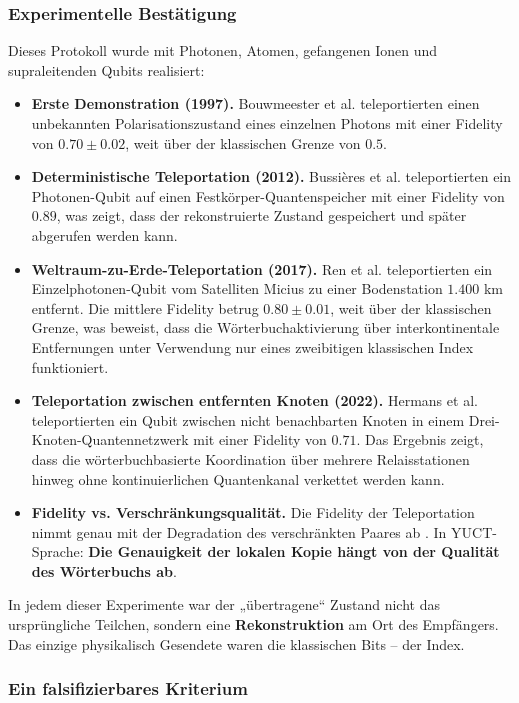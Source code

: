 \documentclass[12pt,a4paper]{article}
\theoremstyle{remark}
\begin{document}
	\subsubsection{Experimentelle Bestätigung}
	
	Dieses Protokoll wurde mit Photonen, Atomen, gefangenen Ionen und supraleitenden Qubits realisiert:
	
	\begin{itemize}
		\item \textbf{Erste Demonstration (1997).} Bouwmeester et al. \cite{Bouwmeester1997} teleportierten einen unbekannten Polarisationszustand eines einzelnen Photons mit einer Fidelity von $0.70 \pm 0.02$, weit über der klassischen Grenze von $0.5$.
		\item \textbf{Deterministische Teleportation (2012).} Bussi\`eres et al. teleportierten ein Photonen-Qubit auf einen Festkörper-Quantenspeicher mit einer Fidelity von $0.89$, was zeigt, dass der rekonstruierte Zustand gespeichert und später abgerufen werden kann.
		\item \textbf{Weltraum-zu-Erde-Teleportation (2017).} Ren et al. \cite{Ren2017} teleportierten ein Einzelphotonen-Qubit vom Satelliten Micius zu einer Bodenstation $1.400$ km entfernt. Die mittlere Fidelity betrug $0.80 \pm 0.01$, weit über der klassischen Grenze, was beweist, dass die Wörterbuchaktivierung über interkontinentale Entfernungen unter Verwendung nur eines zweibitigen klassischen Index funktioniert.
		\item \textbf{Teleportation zwischen entfernten Knoten (2022).} Hermans et al. teleportierten ein Qubit zwischen nicht benachbarten Knoten in einem Drei-Knoten-Quantennetzwerk mit einer Fidelity von $0.71$. Das Ergebnis zeigt, dass die wörterbuchbasierte Koordination über mehrere Relaisstationen hinweg ohne kontinuierlichen Quantenkanal verkettet werden kann.
		\item \textbf{Fidelity vs. Verschränkungsqualität.} Die Fidelity der Teleportation nimmt genau mit der Degradation des verschränkten Paares ab \cite{Knill2005}. In YUCT-Sprache: \textbf{Die Genauigkeit der lokalen Kopie hängt von der Qualität des Wörterbuchs ab}.
	\end{itemize}
	
	In jedem dieser Experimente war der „übertragene“ Zustand nicht das ursprüngliche Teilchen, sondern eine \textbf{Rekonstruktion} am Ort des Empfängers. Das einzige physikalisch Gesendete waren die klassischen Bits – der Index.
	
	\subsubsection{Ein falsifizierbares Kriterium}
	
\end{document}
